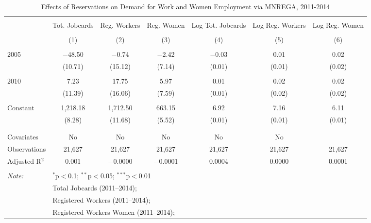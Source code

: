 
\begin{table}[!htbp] \centering 
  \caption{Effects of Reservations on Demand for Work and Women Employment via MNREGA, 2011-2014} 
  \label{mnrega_main_up} 
\scriptsize 
\begin{tabular}{@{\extracolsep{5pt}}lcccccc} 
\\[-1.8ex]\hline 
\hline \\[-1.8ex] 
 & Tot. Jobcards & Reg. Workers & Reg. Women & Log Tot. Jobcards & Log Reg. Workers & Log Reg. Women \\ 
\\[-1.8ex] & (1) & (2) & (3) & (4) & (5) & (6)\\ 
\hline \\[-1.8ex] 
 2005 & $-$48.50 & $-$0.74 & $-$2.42 & $-$0.03 & 0.01 & 0.02 \\ 
  & (10.71) & (15.12) & (7.14) & (0.01) & (0.01) & (0.02) \\ 
  & & & & & & \\ 
 2010 & 7.23 & 17.75 & 5.97 & 0.01 & 0.02 & 0.02 \\ 
  & (11.39) & (16.06) & (7.59) & (0.01) & (0.02) & (0.02) \\ 
  & & & & & & \\ 
 Constant & 1,218.18 & 1,712.50 & 663.15 & 6.92 & 7.16 & 6.11 \\ 
  & (8.28) & (11.68) & (5.52) & (0.01) & (0.01) & (0.01) \\ 
  & & & & & & \\ 
\hline \\[-1.8ex] 
Covariates & No & No & No & No & No &  \\ 
Observations & 21,627 & 21,627 & 21,627 & 21,627 & 21,627 & 21,627 \\ 
Adjusted R$^{2}$ & 0.001 & $-$0.0000 & $-$0.0001 & 0.0004 & 0.0000 & 0.0001 \\ 
\hline 
\hline \\[-1.8ex] 
\textit{Note:}  & \multicolumn{6}{l}{$^{*}$p$<$0.1; $^{**}$p$<$0.05; $^{***}$p$<$0.01} \\ 
 & \multicolumn{6}{l}{Total Jobcards (2011--2014);} \\ 
 & \multicolumn{6}{l}{Registered Workers (2011--2014);} \\ 
 & \multicolumn{6}{l}{Registered Workers Women  (2011--2014);} \\ 
\end{tabular} 
\end{table} 
